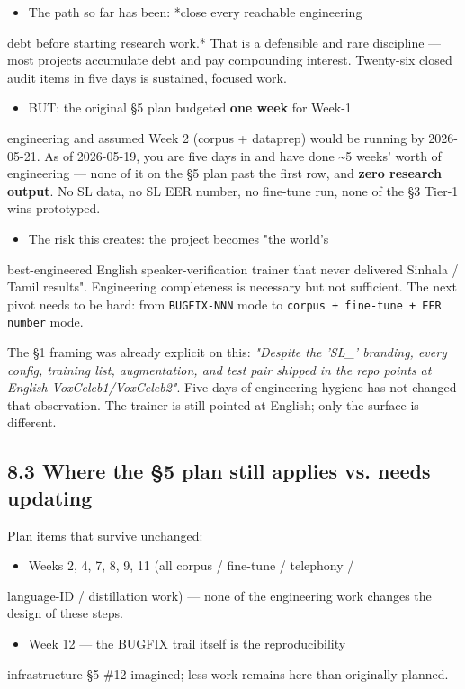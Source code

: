 \documentclass[10pt,a4paper]{article}
\begin{document}
\begin{itemize}[leftmargin=*,itemsep=2pt]
  \item The path so far has been: *close every reachable engineering
\end{itemize}
debt before starting research work.* That is a defensible and rare discipline --- most projects accumulate debt and pay compounding interest. Twenty-six closed audit items in five days is sustained, focused work.
\begin{itemize}[leftmargin=*,itemsep=2pt]
  \item BUT: the original §5 plan budgeted \textbf{one week} for Week-1
\end{itemize}
engineering and assumed Week 2 (corpus + dataprep) would be running by 2026-05-21. As of 2026-05-19, you are five days in and have done \textasciitilde{}5 weeks' worth of engineering --- none of it on the §5 plan past the first row, and \textbf{zero research output}. No SL data, no SL EER number, no fine-tune run, none of the §3 Tier-1 wins prototyped.
\begin{itemize}[leftmargin=*,itemsep=2pt]
  \item The risk this creates: the project becomes "the world's
\end{itemize}
best-engineered English speaker-verification trainer that never delivered Sinhala / Tamil results". Engineering completeness is necessary but not sufficient. The next pivot needs to be hard: from \texttt{BUGFIX-NNN} mode to \texttt{corpus + fine-tune + EER number} mode.

The §1 framing was already explicit on this: \textit{"Despite the 'SL\_' branding, every config, training list, augmentation, and test pair shipped in the repo points at English VoxCeleb1/VoxCeleb2"}. Five days of engineering hygiene has not changed that observation. The trainer is still pointed at English; only the surface is different.

\subsection*{8.3 Where the §5 plan still applies vs. needs updating}

Plan items that survive unchanged:
\begin{itemize}[leftmargin=*,itemsep=2pt]
  \item Weeks 2, 4, 7, 8, 9, 11 (all corpus / fine-tune / telephony /
\end{itemize}
language-ID / distillation work) --- none of the engineering work changes the design of these steps.
\begin{itemize}[leftmargin=*,itemsep=2pt]
  \item Week 12 --- the BUGFIX trail itself is the reproducibility
\end{itemize}
infrastructure §5 \#12 imagined; less work remains here than originally planned.
\end{document}
